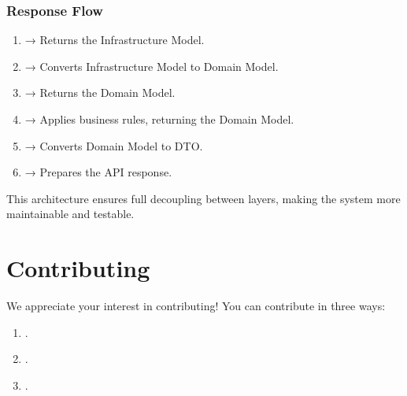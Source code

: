 \documentclass[letterpaper,10pt,english]{sphinxhowto}
\begin{document}
\subsubsection{Response Flow}
\label{\detokenize{architecture/flow/index:response-flow}}\begin{enumerate}
%
\item {} 
\sphinxAtStartPar
{} → Returns the Infrastructure Model.

\item {} 
\sphinxAtStartPar
{} → Converts Infrastructure Model to Domain Model.

\item {} 
\sphinxAtStartPar
{} → Returns the Domain Model.

\item {} 
\sphinxAtStartPar
{} → Applies business rules, returning the Domain Model.

\item {} 
\sphinxAtStartPar
{} → Converts Domain Model to DTO.

\item {} 
\sphinxAtStartPar
{} → Prepares the API response.

\end{enumerate}

\sphinxAtStartPar
This architecture ensures full decoupling between layers, making the system more maintainable and testable.

\sphinxstepscope


\section{Contributing}
\label{\detokenize{contributing/index:contributing}}\label{\detokenize{contributing/index:id1}}\label{\detokenize{contributing/index::doc}}
\sphinxAtStartPar
We appreciate your interest in contributing! You can contribute in three ways:
\begin{enumerate}
%
\item {} 
\sphinxAtStartPar
{\hyperref[\detokenize{contributing/index:id2}]{}}.

\item {} 
\sphinxAtStartPar
{\hyperref[\detokenize{contributing/index:id3}]{}}.

\item {} 
\sphinxAtStartPar
{\hyperref[\detokenize{contributing/index:id5}]{}}.

\end{enumerate}
\end{document}
